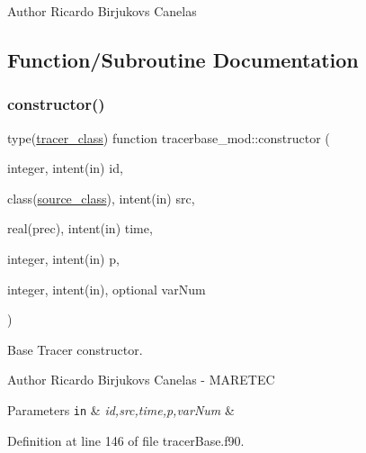 \begin{DoxyAuthor}{Author}
Ricardo Birjukovs Canelas 
\end{DoxyAuthor}


\subsection{Function/\+Subroutine Documentation}
\mbox{\label{namespacetracerbase__mod_acf861b7ca360dcad1331ca85c50853a6}} 
\subsubsection{\texorpdfstring{constructor()}{constructor()}}
{\footnotesize\ttfamily type(\mbox{\hyperlink{structtracerbase__mod_1_1tracer__class}{tracer\+\_\+class}}) function tracerbase\+\_\+mod\+::constructor (\begin{DoxyParamCaption}\item[{integer, intent(in)}]{id,  }\item[{class(\mbox{\hyperlink{structsources__mod_1_1source__class}{source\+\_\+class}}), intent(in)}]{src,  }\item[{real(prec), intent(in)}]{time,  }\item[{integer, intent(in)}]{p,  }\item[{integer, intent(in), optional}]{var\+Num }\end{DoxyParamCaption})\hspace{0.3cm}{\ttfamily [private]}}



Base Tracer constructor. 

\begin{DoxyAuthor}{Author}
Ricardo Birjukovs Canelas -\/ M\+A\+R\+E\+T\+EC 
\end{DoxyAuthor}

\begin{DoxyParams}[1]{Parameters}
\mbox{\tt in}  & {\em id,src,time,p,var\+Num} & \\
\hline
\end{DoxyParams}


Definition at line 146 of file tracer\+Base.\+f90.


